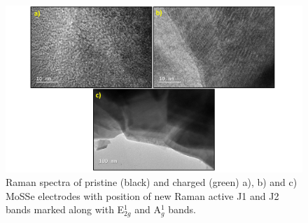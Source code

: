\begin{figure}
  \centering
  \includegraphics[width=\textwidth]{Figures/chap4fig/mose2tem}
  \caption{Raman spectra of pristine (black) and charged (green) a), b)  and c) MoSSe electrodes with position of new Raman active J1 and J2 bands marked along with E$^1_{2g}$ and A$^1_g$ bands.}
  \label{Figures/chap4fig:mose2tem}
\end{figure}
